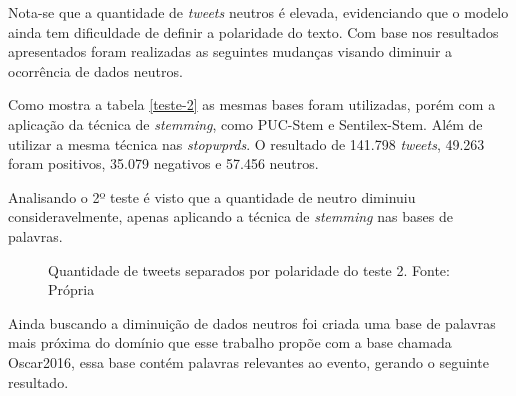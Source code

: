 Nota-se que a quantidade de \textit{tweets} neutros é elevada, evidenciando que o modelo ainda tem dificuldade de definir a polaridade do texto. Com base nos resultados apresentados foram realizadas as seguintes mudanças visando diminuir a ocorrência de dados neutros.
 

Como mostra a tabela \ref{teste-2} as mesmas bases foram utilizadas, porém com a aplicação da técnica de \textit{stemming}, como  PUC-Stem e Sentilex-Stem. Além de utilizar a mesma técnica nas  \textit{stopwprds}. O resultado de 141.798 \textit{tweets}, 49.263 foram positivos, 35.079 negativos e 57.456 neutros.

\begin{table}[]
	\caption{2º teste}
	\label{teste-2}
\end{table}

Analisando o 2º teste é visto que a quantidade de neutro diminuiu consideravelmente, apenas aplicando a técnica de \textit{stemming} nas bases de palavras.
\begin{figure}[!h]
	\centering{}
	\caption{Quantidade de tweets separados por polaridade do teste 2. Fonte: Própria}
	\label{teste-graf-2}
\end{figure}

Ainda buscando a diminuição de dados neutros foi criada uma base de palavras mais próxima do domínio que esse trabalho propõe com a base chamada Oscar2016, essa base contém palavras relevantes ao evento, gerando o seguinte resultado.

